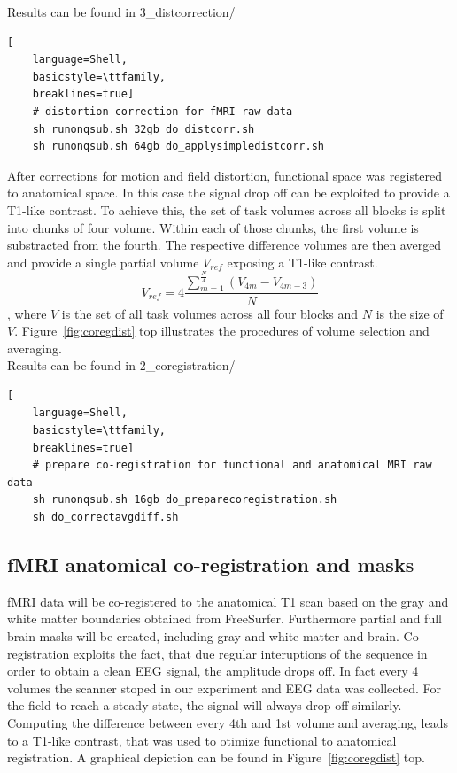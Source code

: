 \documentclass[12pt,a4paper]{scrartcl}
\begin{document}
\noindent Results can be found in 3\_distcorrection/\\
\begin{lstlisting}[
    language=Shell,
    basicstyle=\ttfamily,
    breaklines=true]
    # distortion correction for fMRI raw data
    sh runonqsub.sh 32gb do_distcorr.sh
    sh runonqsub.sh 64gb do_applysimpledistcorr.sh
\end{lstlisting}
After corrections for motion and field distortion, functional space was registered to anatomical space. In this case the signal drop off can be exploited to provide a T1-like contrast. To achieve this, the set of task volumes across all blocks is split into chunks of four volume. Within each of those chunks, the first volume is substracted from the fourth. The respective difference volumes are then averged and provide a single partial volume $V_{ref}$ exposing a T1-like contrast.
\begin{equation}
  V_{ref}=4\frac{\sum_{m=1}^{\frac{N}{4}}(V_{4m}-V_{4m-3})}{N}
\end{equation}
\noindent, where $V$ is the set of all task volumes across all four blocks and $N$ is the size of $V$. Figure~\ref{fig:coregdist} top illustrates the procedures of volume selection and averaging.\\

\noindent Results can be found in 2\_coregistration/\\
\begin{lstlisting}[
    language=Shell,
    basicstyle=\ttfamily,
    breaklines=true]
    # prepare co-registration for functional and anatomical MRI raw data
    sh runonqsub.sh 16gb do_preparecoregistration.sh
    sh do_correctavgdiff.sh
\end{lstlisting}

\subsection{fMRI anatomical co-registration and masks}
fMRI data will be co-registered to the anatomical T1 scan based on the gray and white matter boundaries obtained from FreeSurfer. Furthermore partial and full brain masks will be created, including gray and white matter and brain. Co-registration exploits the fact, that due regular interuptions of the sequence in order to obtain a clean EEG signal, the amplitude drops off. In fact every 4 volumes the scanner stoped in our experiment and EEG data was collected. For the field to reach a steady state, the signal will always drop off similarly.\\
\noindent Computing the difference between every 4th and 1st volume and averaging, leads to a T1-like contrast, that was used to otimize functional to anatomical registration. A graphical depiction can be found in Figure~\ref{fig:coregdist} top.\\
\end{document}
